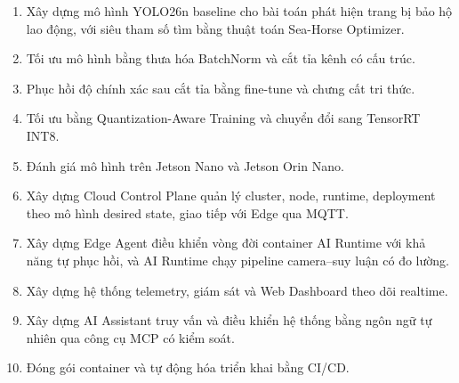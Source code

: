 \begin{enumerate}
  \item Xây dựng mô hình YOLO26n baseline cho bài toán phát hiện trang bị bảo hộ
        lao động, với siêu tham số tìm bằng thuật toán Sea-Horse Optimizer.
  \item Tối ưu mô hình bằng thưa hóa BatchNorm và cắt tỉa kênh có cấu trúc.
  \item Phục hồi độ chính xác sau cắt tỉa bằng fine-tune và chưng cất tri thức.
  \item Tối ưu bằng Quantization-Aware Training và chuyển đổi sang TensorRT INT8.
  \item Đánh giá mô hình trên Jetson Nano và Jetson Orin Nano.
  \item Xây dựng Cloud Control Plane quản lý cluster, node, runtime, deployment
        theo mô hình desired state, giao tiếp với Edge qua MQTT.
  \item Xây dựng Edge Agent điều khiển vòng đời container AI Runtime với khả năng
        tự phục hồi, và AI Runtime chạy pipeline camera--suy luận có đo lường.
  \item Xây dựng hệ thống telemetry, giám sát và Web Dashboard theo dõi realtime.
  \item Xây dựng AI Assistant truy vấn và điều khiển hệ thống bằng ngôn ngữ tự
        nhiên qua công cụ MCP có kiểm soát.
  \item Đóng gói container và tự động hóa triển khai bằng CI/CD.
\end{enumerate}
